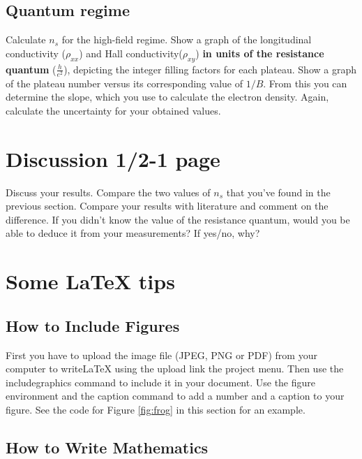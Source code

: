 \documentclass[a4paper]{article}
\begin{document}
\subsection{Quantum regime}
Calculate $n_{s}$ for the high-field regime.
Show a graph of the longitudinal conductivity ($\rho_{xx}$) and Hall conductivity($\rho_{xy}$) \textbf{in units of the resistance quantum} ($\frac{h}{e^{2}}$), depicting the integer filling factors for each plateau.
Show a graph of the plateau number versus its corresponding value of $1/B$. From this you can determine the slope, which you use to calculate the electron density.
Again, calculate the uncertainty for your obtained values.

\section{Discussion 1/2-1 page}
Discuss your results. Compare the two values of $n_{s}$ that you've found in the previous section. Compare your results with literature and comment on the difference. If you didn't know the value of the resistance quantum, would you be able to deduce it from your measurements? If yes/no, why?

\newpage
\section{Some LaTeX tips}
\label{sec:latex}
\subsection{How to Include Figures}

First you have to upload the image file (JPEG, PNG or PDF) from your computer to writeLaTeX using the upload link the project menu. Then use the includegraphics command to include it in your document. Use the figure environment and the caption command to add a number and a caption to your figure. See the code for Figure \ref{fig:frog} in this section for an example.




\subsection{How to Write Mathematics}
\end{document}
